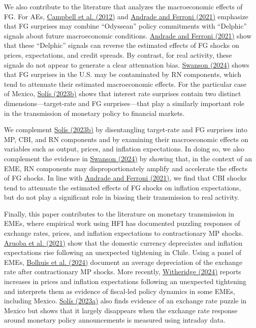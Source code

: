 \documentclass[\latexroot/\projectname]{subfiles}
\begin{document}
We also contribute to the literature that analyzes the macroeconomic effects of FG. For AEs, \hyperlink{Campbell et al. (2012)}{Campbell et al. (2012)} and \hyperlink{Andrade and Ferroni (2021)}{Andrade and Ferroni (2021)} emphasize that FG surprises may combine “Odyssean” policy commitments with “Delphic” signals about future macroeconomic conditions. \hyperlink{Andrade and Ferroni (2021)}{Andrade and Ferroni (2021)} show that these “Delphic” signals can reverse the estimated effects of FG shocks on prices, expectations, and credit spreads. By contrast, for real activity, these signals do not appear to generate a clear attenuation bias. \hyperlink{Swanson (2024)}{Swanson (2024)} shows that FG surprises in the U.S. may be contaminated by RN components, which tend to attenuate their estimated macroeconomic effects. For the particular case of Mexico, \hyperlink{Solis (2023b)}{Solís (2023b)} shows that interest rate surprises contain two distinct dimensions—target-rate and FG surprises—that play a similarly important role in the transmission of monetary policy to financial markets. 

We complement \hyperlink{Solis (2023b)}{Solís (2023b)} by disentangling target-rate and FG surprises into MP, CBI, and RN components and by examining their macroeconomic effects on variables such as output, prices, and inflation expectations. In doing so, we also complement the evidence in \hyperlink{Swanson (2024)}{Swanson (2024)} by showing that, in the context of an EME, RN components may disproportionately amplify and accelerate the effects of FG shocks. In line with \hyperlink{Andrade and Ferroni (2021)}{Andrade and Ferroni (2021)}, we find that CBI shocks tend to attenuate the estimated effects of FG shocks on inflation expectations, but do not play a significant role in biasing their transmission to real activity.

Finally, this paper contributes to the literature on monetary transmission in EMEs, where empirical work using HFI has documented puzzling responses of exchange rates, prices, and inflation expectations to contractionary MP shocks. \hyperlink{Aruoba et al. (2021)}{Aruoba et al. (2021)} show that the domestic currency depreciates and inflation expectations rise following an unexpected tightening in Chile. Using a panel of EMEs, \hyperlink{Bolhuis et al. (2024)}{Bolhuis et al. (2024)} document an average depreciation of the exchange rate after contractionary MP shocks. More recently, \hyperlink{Witheridge (2024)}{Witheridge (2024)} reports increases in prices and inflation expectations following an unexpected tightening and interprets them as evidence of fiscal-led policy dynamics in some EMEs, including Mexico. \hyperlink{Solís (2023a)}{Solís (2023a)} also finds evidence of an exchange rate puzzle in Mexico but shows that it largely disappears when the exchange rate response around monetary policy announcements is measured using intraday data.
\end{document}
